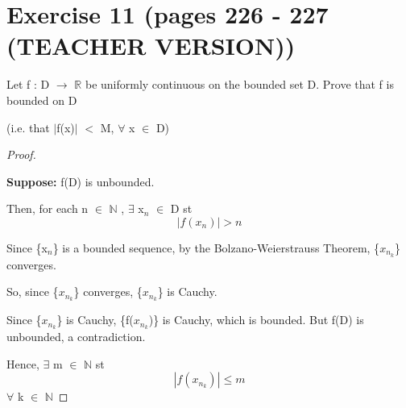 \documentclass{article}
\newcommand{\mt}[1]{\ensuremath{#1}}
\newcommand\bsc[2][\DefaultOpt]{%
  \def\DefaultOpt{#2}%
  \section[#1]{#2}%
}
\newcommand{\bgpf}{\begin{proof} $ $\newline}
\newcommand{\supp}[1]{\textbf{Suppose: } #1}
\newcommand{\epf}{\end{proof}}
\newcommand{\dbs}[3]{\mt{#1_{#2_#3}}}
\newcommand{\br}{\mt{\mathbb{R}} }       %
\newcommand{\bn}{\mt{\mathbb{N}} }       %
\newcommand{\fa}{\mt{\forall} }          %
\newcommand{\mem}{\mt{\in} }
\newcommand{\exs}{\mt{\exists} }
\newcommand{\lra}{ \mt{\longrightarrow} } %
\newcommand{\av}[1]{\mt{|}#1\mt{|}}  %
\newcommand{\bk}[1]{\{#1\}}
\newcommand{\ls}{\mt{<} }
\newcommand{\lse}{\mt{\leq} }
\newcommand{\uw}[2]{#1\mt{_{#2}}}
\newcommand{\eqn}[1]{\[#1\]}
\begin{document}
\newpage

\bsc{Exercise 11 (pages 226 - 227 (TEACHER VERSION))}{

Let f : D \lra \br be uniformly continuous on the bounded set D. Prove that f is bounded on D

(i.e. that \av{f(x)} \ls M, \fa x \mem D)

\bgpf

\supp{f(D) is unbounded.}

Then, for each n \mem \bn, \exs \uw{x}{n} \mem D st
\eqn{|f(x_n)| > n}

Since \bk{\uw{x}{n}} is a bounded sequence, by the Bolzano-Weierstrauss Theorem, \bk{\dbs{x}{n}{k}} converges.

So, since \bk{\dbs{x}{n}{k}} converges, \bk{\dbs{x}{n}{k}} is Cauchy.

Since \bk{\dbs{x}{n}{k}} is Cauchy, \bk{f(\dbs{x}{n}{k})} is Cauchy, which is bounded. But f(D) is unbounded, a contradiction.

Hence, \exs m \mem \bn st
\eqn{|f(\dbs{x}{n}{k})| \lse m}
\fa k \mem \bn
\epf

}
\end{document}
